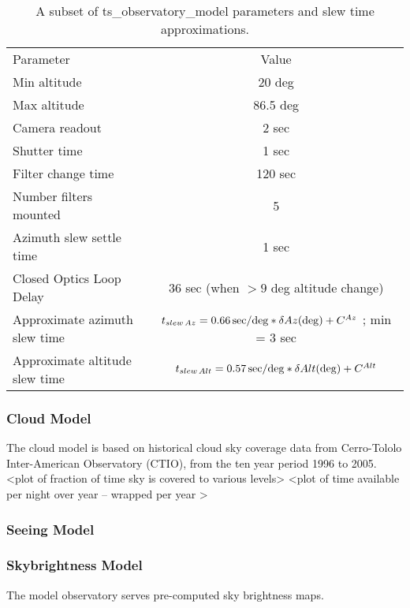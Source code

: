 \begin{table}
\begin{centering}
\begin{tabular}{lc}
\toprule
Parameter  & Value \\
Min altitude  & 20 deg \\
Max altitude & 86.5 deg \\
Camera readout & 2 sec\\
Shutter time & 1 sec \\
Filter change time & 120 sec \\
Number filters mounted & 5 \\
Azimuth slew settle time & 1 sec \\
Closed Optics Loop Delay & 36 sec (when $>9$ deg altitude change) \\
Approximate azimuth slew time &   $ t_{slew \, Az} = 0.66 \, {\rm sec/deg} * \delta Az ({\rm deg}) + C^{Az} $ ;    min = 3 sec \\
Approximate altitude slew time  &  $  t_{slew \, Alt} = 0.57 \, {\rm sec/deg} * \delta Alt ({\rm deg}) + C^{Alt} $ \\
\hline
\end{tabular}
\caption{A subset of ts\_observatory\_model parameters and slew time approximations.}
\label{tab:tsModel}
\end{centering}
\end{table}

\subsubsection{Cloud Model}

The cloud model is based on historical cloud sky coverage data from Cerro-Tololo Inter-American Observatory (CTIO), from the ten year period 1996 to 2005. 
<plot of fraction of time sky is covered to various levels> 
<plot of time available per night over year -- wrapped per year >

\subsubsection{Seeing Model}




\subsubsection{Skybrightness Model}

The model observatory serves pre-computed sky brightness maps. 

